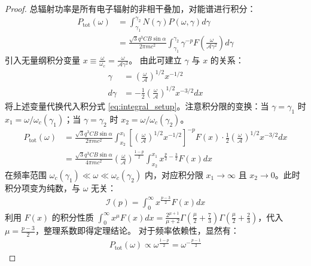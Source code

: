 \begin{proof}
    总辐射功率是所有电子辐射的非相干叠加，对能谱进行积分：
    \begin{align}
        P_{\text{tot}}(\omega) &= \int_{\gamma_1}^{\gamma_2} N(\gamma) P(\omega, \gamma) d\gamma \nonumber \\
        &= \frac{\sqrt{3} q^3 C B \sin\alpha}{2\pi m c^2} \int_{\gamma_1}^{\gamma_2} \gamma^{-p} F\left( \frac{\omega}{\mathcal{A} \gamma^2} \right) d\gamma \label{eq:integral_setup}
    \end{align}
    引入无量纲积分变量 $x \equiv \frac{\omega}{\omega_c} = \frac{\omega}{\mathcal{A} \gamma^2}$。
    由此可建立 $\gamma$ 与 $x$ 的关系：
    \begin{align}
        \gamma &= \left( \frac{\omega}{\mathcal{A}} \right)^{1/2} x^{-1/2} \\
        d\gamma &= -\frac{1}{2} \left( \frac{\omega}{\mathcal{A}} \right)^{1/2} x^{-3/2} dx
    \end{align}
    将上述变量代换代入积分式 \eqref{eq:integral_setup}。注意积分限的变换：当 $\gamma = \gamma_1$ 时 $x_1 = \omega/\omega_c(\gamma_1)$；当 $\gamma = \gamma_2$ 时 $x_2 = \omega/\omega_c(\gamma_2)$。
    \begin{align}
        P_{\text{tot}}(\omega) &= \frac{\sqrt{3} q^3 C B \sin\alpha}{2\pi m c^2} \int_{x_2}^{x_1} \left[ \left( \frac{\omega}{\mathcal{A}} \right)^{1/2} x^{-1/2} \right]^{-p} F(x) \cdot \frac{1}{2} \left( \frac{\omega}{\mathcal{A}} \right)^{1/2} x^{-3/2} dx \nonumber \\
        &= \frac{\sqrt{3} q^3 C B \sin\alpha}{4\pi m c^2} \left( \frac{\omega}{\mathcal{A}} \right)^{\frac{1-p}{2}} \int_{x_2}^{x_1} x^{\frac{p}{2} - \frac{3}{2}} F(x) dx \label{eq:integral_x}
    \end{align}
    在频率范围 $\omega_c(\gamma_1) \ll \omega \ll \omega_c(\gamma_2)$ 内，对应积分限 $x_1 \to \infty$ 且 $x_2 \to 0$。此时积分项变为纯数，与 $\omega$ 无关：
    \begin{align}
        \mathcal{I}(p) = \int_0^{\infty} x^{\frac{p-3}{2}} F(x) dx
    \end{align}
    利用 $F(x)$ 的积分性质 $\int_0^\infty x^\mu F(x) dx = \frac{2^{\mu+1}}{\mu+2} \Gamma(\frac{\mu}{2} + \frac{7}{3}) \Gamma(\frac{\mu}{2} + \frac{2}{3})$，代入 $\mu = \frac{p-3}{2}$，整理系数即得定理结论。
    对于频率依赖性，显然有：
    \begin{align}
        P_{\text{tot}}(\omega) \propto \omega^{\frac{1-p}{2}} = \omega^{-\frac{p-1}{2}}
    \end{align}
\end{proof}

